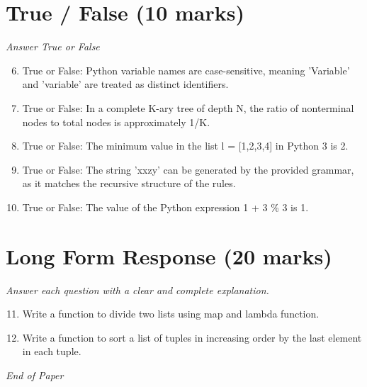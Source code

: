 \documentclass[12pt]{article}
\begin{document}
\section*{True / False (10 marks)}
\textit{Answer True or False}
\begin{enumerate}[label=\arabic*.]
\setcounter{enumi}{5}
\item True or False: Python variable names are case-sensitive, meaning 'Variable' and 'variable' are treated as distinct identifiers.
\item True or False: In a complete K-ary tree of depth N, the ratio of nonterminal nodes to total nodes is approximately 1/K.
\item True or False: The minimum value in the list l = [1,2,3,4] in Python 3 is 2.
\item True or False: The string 'xxzy' can be generated by the provided grammar, as it matches the recursive structure of the rules.
\item True or False: The value of the Python expression 1 + 3 \% 3 is 1.
\end{enumerate}

\section*{Long Form Response (20 marks)}
\textit{Answer each question with a clear and complete explanation.}
\begin{enumerate}[label=\arabic*.]
\setcounter{enumi}{10}
\item Write a function to divide two lists using map and lambda function.
\item Write a function to sort a list of tuples in increasing order by the last element in each tuple.
\end{enumerate}

\vfill
\noindent\textit{End of Paper}
\end{document}
